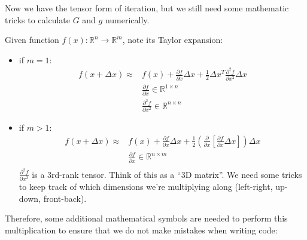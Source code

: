 Now we have the tensor form of iteration, but we still need some mathematic tricks to calculate $G$ and $g$ numerically.

Given function $f(x): \mathbb{R}^n \to \mathbb{R}^m$, note its Taylor expansion:
\begin{itemize}
    \item if $m=1$:
    \begin{equation}
        \begin{aligned} f(x + \Delta x) \approx & f(x) + \frac{\partial f}{\partial x} \Delta x + \frac{1}{2}\Delta x^T \frac{\partial^2f}{\partial x^2}\Delta x \\ & \frac{\partial f}{\partial x} \in \mathbb{R}^{1 \times n} \\ & \frac{\partial^2f}{\partial x^2} \in \mathbb{R}^{n \times n} \end{aligned}
    \end{equation}
    \item if $m>1$:
    \begin{equation}
        \begin{aligned} f(x + \Delta x) \approx & f(x) + \frac{\partial f}{\partial x} \Delta x + \frac{1}{2}(\frac{\partial}{\partial x} [\frac{\partial f}{\partial x} \Delta x]) \Delta x \\ & \frac{\partial f}{\partial x} \in \mathbb{R}^{n \times m} \\ \end{aligned}
    \end{equation}
    $\frac{\partial^2f}{\partial x^2}$ is a 3rd-rank tensor. Think of this as a ``3D matrix''. We need some tricks to keep track of which dimensions we're multiplying along (left-right, up-down, front-back).
\end{itemize}

Therefore, some additional mathematical symbols are needed to perform this multiplication to ensure that we do not make mistakes when writing code:

